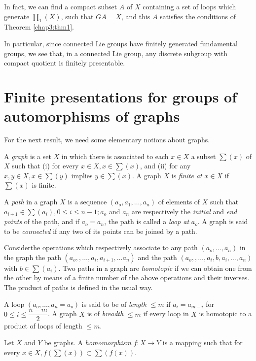 In fact, we can find a compact subset $A$ of $X$ containing a set of
loops which generate $\prod_1 (X)$, such that $GA = X$, and this $A$
satisfies the conditions of Theorem \ref{chap3:thm1}. 

In particular, since connected Lie groups have finitely generated
fundamental groups, we see that, in a connected Lie group, any
discrete subgroup with compact quotient is finitely presentable. 

\section[Finite presentations for groups of automorphisms....]{Finite presentations for groups of automorphisms of
  graphs}\label{chap3:sec2}%

For the next result, we need some elementary notions about graphs.

A \textit{ graph} is a set $X$ in which there is associated to each $
x \in X$ a subset $\sum (x)$ of $X$ such that (i) for every $x \in
X, x \in \sum (x)$, and (ii) for any $x,y \in X, x \in \sum (y)$
implies $y \in \sum(x)$. A graph $X$ is \textit{ finite at} $x \in X$
if $\sum (x)$ is finite. 

A \textit{ path} in a graph $X$ is a sequence $(a_o,a_1 ,\ldots ,
a_n)$ of elements of $X$ such that $a_{i+1} \in \sum (a_i) , 0 \leq i
\leq n-1; a_o$ and $a_n$ are respectively the \textit{initial} and
\textit{end points} of the path, and if $a_o = a_n$, the path is
called a \textit{loop at }$a_o$. A graph is said to be
\textit{connected} if any two of its points can be joined by a path. 

Consider\pageoriginale the operations which respectively associate to
any path $(a_o ,\ldots , a_n)$ in the graph the path $(a_o, ,\ldots , a_{i}, a_{i+1},
\ldots a_n)$ and the path $(a_o, ,\ldots , a_i, b, a_i , \ldots,a_n)$
with $b \in \sum(a_i)$. Two paths in a graph are \textit{homotopic} if
we can obtain one from the other by means of a finite number of the
above operations and their inverses. The product of paths is defined
in the usual way. 

A loop $(a_o ,\ldots , a_n =a_o)$ is said to be of \textit{length}
$\leq m$ if $a_i = a_{m-i}$ for $0 \leq i \leq \dfrac{n-m}{2}$. A
graph $X$ is of \textit{breadth} $\leq m$ if every loop in $X$ is
homotopic to a product of loops of length $\leq m$. 

Let $X$ and $Y$ be graphs. A \textit{homomorphism} $f: X \to Y$ is a
mapping such that for every $x \in X, f ( \sum (x)) \subset
\sum(f(x))$.

